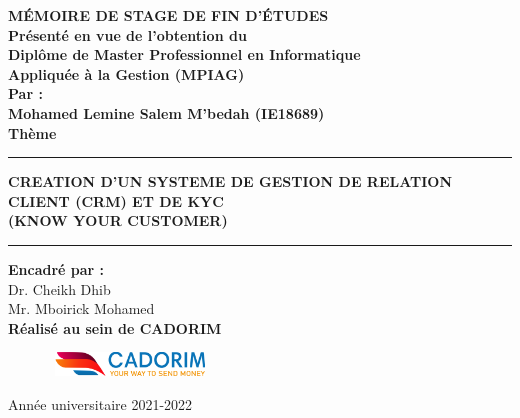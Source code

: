 \documentclass[a4paper, 12pt]{report}
\begin{document}
\begin{titlepage}
\begin{center}
			\bf{MÉMOIRE DE STAGE DE FIN D'ÉTUDES} \\
			\vspace{1cm}
			{\bf Présenté en vue de l’obtention du } \vspace{-0.2cm}\\
			{\bf Diplôme de Master Professionnel en Informatique}\vspace{-0.2cm}\\
				{\bf	Appliquée à la Gestion (MPIAG)}\\ \vspace{0.2cm}
				{\bf Par :}\\ \vspace{0.2cm}
					{\bf Mohamed Lemine Salem M’bedah (IE18689) }\\ \vspace{0.2cm}
			\huge{\textbf{Thème}}\\ 
			\noindent\rule{\textwidth}{1mm}
			\Large{\bf{CREATION D’UN SYSTEME DE GESTION DE RELATION CLIENT (CRM)  ET DE KYC  \\ (KNOW YOUR CUSTOMER)}}
			\noindent\rule{\textwidth}{1mm}
		\end{center}
		\vspace{0cm}
		\begin{center}
			
			{\bf Encadré par :}\\
			{Dr. Cheikh Dhib} \\
			{Mr. Mboirick Mohamed} \\
			{\bf Réalisé au sein de CADORIM }
			
			
		\end{center}
		\begin{figure}[htbp]
		\hbox{
			\hspace*{5cm}
			\includegraphics[width=150px]{./Template LaTeX/Images/cado_logo.png}
		} 
		\end{figure}
		
		\begin{center}
			Année universitaire 2021-2022
		\end{center}
	\end{titlepage}
\end{document}
